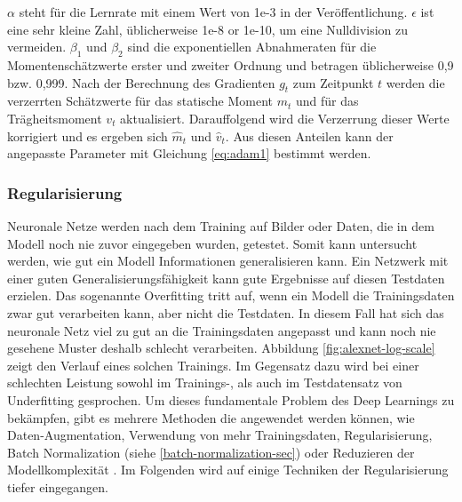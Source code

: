 \mypar $\alpha$ steht für die Lernrate mit einem Wert von 1e-3 in der Veröffentlichung. $\epsilon$ ist eine sehr kleine Zahl, üblicherweise 1e-8 or 1e-10, um eine Nulldivision zu vermeiden. $\beta_1$ und $\beta_2$ sind die exponentiellen Abnahmeraten für die Momentenschätzwerte erster und zweiter Ordnung und betragen üblicherweise 0,9 bzw. 0,999. Nach der Berechnung des Gradienten $g_t$ zum Zeitpunkt $t$ werden die verzerrten Schätzwerte für das statische Moment $m_t$ und für das Trägheitsmoment $v_t$ aktualisiert. Darauffolgend wird die Verzerrung dieser Werte korrigiert und es ergeben sich $\hat{m}_t$ und $\hat{v}_t$. Aus diesen Anteilen kann der angepasste Parameter mit Gleichung \ref{eq:adam1} bestimmt werden. \cite{Goodfellow-et-al-2016}


\subsubsection{Regularisierung}\label{sec:regularisierung-sec}
Neuronale Netze werden nach dem Training auf Bilder oder Daten, die in dem Modell noch nie zuvor eingegeben wurden, getestet. Somit kann untersucht werden, wie gut ein Modell Informationen generalisieren kann. Ein Netzwerk mit einer guten Generalisierungsfähigkeit kann gute Ergebnisse auf diesen Testdaten erzielen. Das sogenannte Overfitting tritt auf, wenn ein Modell die Trainingsdaten zwar gut verarbeiten kann, aber nicht die Testdaten. In diesem Fall hat sich das neuronale Netz viel zu gut an die Trainingsdaten angepasst und kann noch nie gesehene Muster deshalb schlecht verarbeiten. Abbildung \ref{fig:alexnet-log-scale} zeigt den Verlauf eines solchen Trainings. Im Gegensatz dazu wird bei einer schlechten Leistung sowohl im Trainings-, als auch im Testdatensatz von Underfitting gesprochen. Um dieses fundamentale Problem des Deep Learnings zu bekämpfen, gibt es mehrere Methoden die angewendet werden können, wie Daten-Augmentation, Verwendung von mehr Trainingsdaten, Regularisierung, Batch Normalization (siehe \ref{batch-normalization-sec}) oder Reduzieren der Modellkomplexität \cite{overfitting-mechanism-and-avoidance-in-dnl}. Im Folgenden wird auf einige Techniken der Regularisierung tiefer eingegangen. \cite{cnns-an-overview-and-application-in-radiology}

